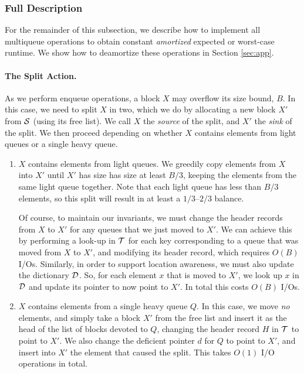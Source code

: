 \documentclass[11pt,letterpaper]{article}
\newcommand{\eat}[1]{}
\begin{document}
\subsubsection{Full Description}
\label{sec:basic}
For the remainder of this subsection, we describe how to implement all multiqueue operations
to obtain constant  \emph{amortized} expected or worst-case runtime. We show how to
deamortize these operations in Section \ref{sec:app}.


\paragraph{The Split Action.}
As we perform enqueue operations, a block $X$ may overflow 
its size bound, $B$.
In this case, we need to split $X$ in two, which we do 
by allocating a new block $X'$ from $\cal S$ (using its free list). 
We call $X$ the \emph{source} of the split, and $X'$ the \emph{sink} of the split.
We then proceed depending on whether $X$ contains 
elements from light queues or a single heavy queue.
\begin{enumerate}
\item
$X$ contains elements from light queues.
We greedily copy elements from $X$ into $X'$ until $X'$ has size 
has size at least $B/3$, keeping the elements from the same light queue together.
Note that each light queue has less than $B/3$ elements, so this split will result in at
least a $1/3$--$2/3$ balance. 

Of course, to maintain our invariants, we must change the header records 
from $X$ to $X'$ for any queues that we just moved to $X'$.
We can achieve this by performing a look-up in $\cal T$ for each key corresponding to a queue that was moved
from $X$ to $X'$, and modifying its header record, which requires $O(B)$ I/Os. Similarly, in order to support location awareness,
we must also update the dictionary $\cal D$. So, for each element $x$
that is moved to $X'$, we look up $x$ in $\cal D$ and update its pointer to now
point to $X'$.
In total this costs $O(B)$ I/Os. \eat{ but we can charge these,
in an amortized sense, to the $O(B)$
enqueue operations that caused 
$X$ to grow from size at most $2B/3$ to at least $B$.
(These enqueue operations will never be charged in this way again.)}
\item
$X$ contains elements from a single heavy queue $Q$. In this case, we move \emph{no} elements,
and simply take a block $X'$ from the free list and insert it as the head of the list of blocks devoted to $Q$, changing
the header record $H$ in $\cal T$ to point to $X'$. 
We also change the deficient pointer $d$ for $Q$ to point to $X'$, and insert into $X'$ the element that caused the split.
This takes $O(1)$ I/O operations in total.

\end{enumerate}
\end{document}
